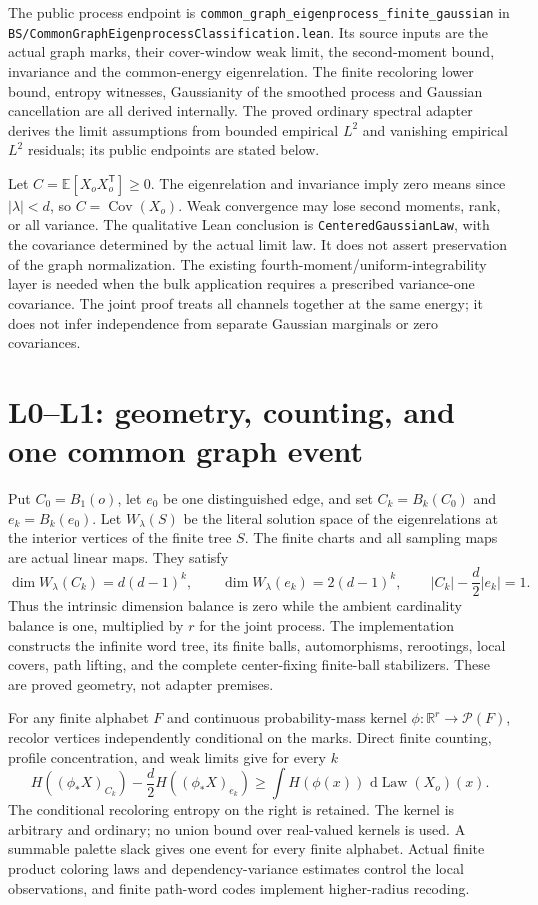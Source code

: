 \documentclass[11pt]{article}
\newcommand{\R}{\mathbb R}
\newcommand{\E}{\mathbb E}
\newcommand{\Cov}{\operatorname{Cov}}
\newcommand{\Law}{\operatorname{Law}}
\newcommand{\dd}{\,\mathrm d}
\newcommand{\lean}[1]{{\small\nolinkurl{#1}}}
\begin{document}
The public process endpoint is
\lean{common_graph_eigenprocess_finite_gaussian} in
\lean{BS/CommonGraphEigenprocessClassification.lean}. Its source inputs
are the actual graph marks, their cover-window weak limit, the second-moment
bound, invariance and the common-energy eigenrelation. The finite recoloring
lower bound, entropy witnesses, Gaussianity of the smoothed process and
Gaussian cancellation are all derived internally. The proved ordinary spectral
adapter derives the limit assumptions from bounded empirical $L^2$ and
vanishing empirical $L^2$ residuals; its public endpoints are stated below.

Let $C=\E[X_oX_o^{\mathsf T}]\geq0$. The eigenrelation and invariance imply
zero means since $|\lambda|<d$, so $C=\Cov(X_o)$. Weak convergence may lose
second moments, rank, or all variance. The qualitative Lean conclusion is
\lean{CenteredGaussianLaw}, with the covariance determined by the actual
limit law. It does not assert preservation of the graph normalization.
The existing fourth-moment/uniform-integrability layer is needed when the
bulk application requires a prescribed variance-one covariance. The joint
proof treats all channels together at the same energy; it does not infer
independence from separate Gaussian marginals or zero covariances.

\section{L0--L1: geometry, counting, and one common graph event}
Put $C_0=B_1(o)$, let $e_0$ be one distinguished edge, and set
$C_k=B_k(C_0)$ and $e_k=B_k(e_0)$. Let $W_\lambda(S)$ be the literal
solution space of the eigenrelations at the interior vertices of the finite
tree $S$. The finite charts and all sampling maps are actual linear maps.
They satisfy
\[
 \dim W_\lambda(C_k)=d(d-1)^k,\qquad
 \dim W_\lambda(e_k)=2(d-1)^k,\qquad
 |C_k|-\frac d2|e_k|=1.
\]
Thus the intrinsic dimension balance is zero while the ambient cardinality
balance is one, multiplied by $r$ for the joint process. The implementation
constructs the infinite word tree, its finite balls, automorphisms,
rerootings, local covers, path lifting, and the complete center-fixing
finite-ball stabilizers. These are proved geometry, not adapter premises.

For any finite alphabet $F$ and continuous probability-mass kernel
$\phi:\R^r\to\mathcal P(F)$, recolor vertices independently conditional on
the marks. Direct finite counting, profile concentration, and weak limits
give for every $k$
\begin{equation}\label{eq:finite}
 H((\phi_*X)_{C_k})-\frac d2H((\phi_*X)_{e_k})
 \geq \int H(\phi(x))\,\dd\Law(X_o)(x).
\end{equation}
The conditional recoloring entropy on the right is retained. The kernel
is arbitrary and ordinary; no union bound over real-valued kernels is used.
A summable palette slack gives one event for every finite alphabet. Actual
finite product coloring laws and dependency-variance estimates control the
local observations, and finite path-word codes implement higher-radius
recoding.
\end{document}
